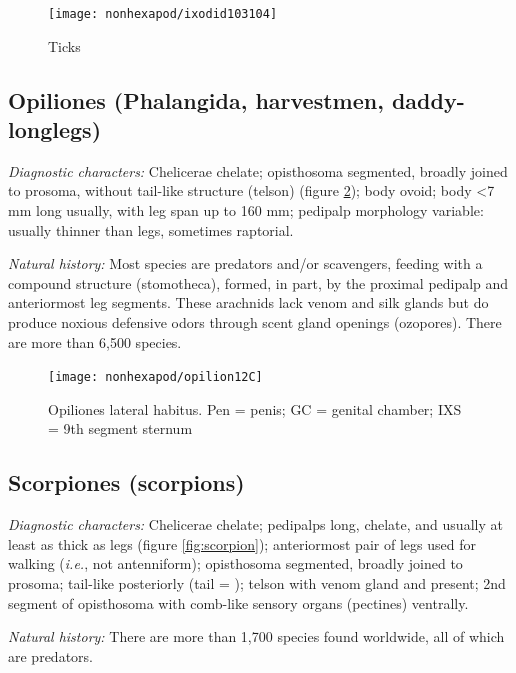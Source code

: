 \begin{figure}[ht!]
  \centering
    \texttt{[image: nonhexapod/ixodid103104]}
  \caption{Ticks \citep[][Figs. 103, 104]{bhlitem132773acari}}
  \label{fig:ixodid}
\end{figure}

\subsection{Opiliones (Phalangida, harvestmen, daddy-longlegs)}
\noindent{}\textit{Diagnostic characters:} Chelicerae chelate; opisthosoma segmented, broadly joined to prosoma, without tail-like structure (telson) (figure \ref{fig:opiliones1}); body ovoid; body  \textless7 mm long usually, with leg span up to 160 mm; pedipalp morphology variable: usually thinner than legs, sometimes raptorial.\vspace{3mm}

\noindent{}\textit{Natural history:} Most species are predators and/or scavengers, feeding with a compound structure (stomotheca), formed, in part, by the proximal pedipalp and anteriormost leg segments. These arachnids lack venom and silk glands but do produce noxious defensive odors through scent gland openings (ozopores). There are more than 6,500 species.\vspace{3mm}

\begin{figure}[ht!]
  \centering
    \texttt{[image: nonhexapod/opilion12C]}
  \caption{Opiliones lateral habitus. Pen = penis; GC = genital chamber; IXS = 9th segment sternum  \citep{snodgrass1937morphology}}
  \label{fig:opiliones1}
\end{figure}

\subsection{Scorpiones (scorpions)}
\noindent{}\textit{Diagnostic characters:} Chelicerae chelate; pedipalps long, chelate, and usually at least as thick as legs (figure \ref{fig:scorpion}); anteriormost pair of legs used for walking (\textit{i.e.}, not antenniform); opisthosoma segmented, broadly joined to prosoma; tail-like posteriorly (tail = ); telson with venom gland and  present; 2nd segment of opisthosoma with comb-like sensory organs (pectines) ventrally.\vspace{3mm}

\noindent{}\textit{Natural history:} There are more than 1,700 species found worldwide, all of which are predators.\vspace{3mm}

